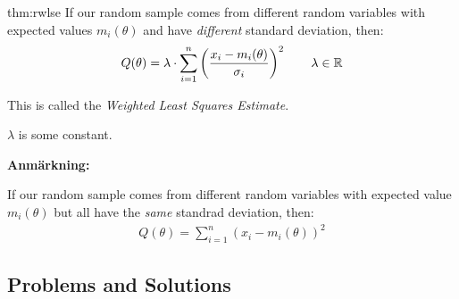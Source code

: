 \par\bigskip
\begin{theo}{thm:rwlse}
  If our random sample comes from different random variables with expected values $m_i(\theta)$ and have \textit{different} standard deviation, then:
  \begin{equation*}
    \begin{gathered}
      Q(\theta) = \lambda\cdot\sum_{i=1}^{n}\left(\dfrac{x_i-m_i(\theta)}{\sigma_i}\right)^2\qquad\lambda\in\mathbb{R}
    \end{gathered}
  \end{equation*}
  \par\bigskip
  \noindent This is called the \textit{Weighted Least Squares Estimate}.\par
  \noindent $\lambda$ is some constant.\par
\end{theo}
\par\bigskip
\noindent\textbf{Anmärkning:}\par
\noindent If our random sample comes from different random variables with expected value $m_i(\theta)$ but all have the \textit{same} standrad deviation, then:
\begin{equation*}
  \begin{gathered}
    Q(\theta) = \sum_{i=1}^{n}(x_i-m_i(\theta))^2
  \end{gathered}
\end{equation*}
\par\bigskip
\subsection{Problems and Solutions}\hfill\\\par
